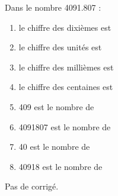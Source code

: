 \begin{exercice*}
    Dans le nombre \num{4 091.807} :
       \begin{enumerate}
          \item le chiffre des dixièmes est \dotfill\smallskip
          \item le chiffre des unités est \dotfill\smallskip
          \item le chiffre des millièmes est \dotfill\smallskip
          \item le chiffre des centaines est \dotfill\smallskip
          \item \num{409} est le nombre de \dotfill\smallskip
          \item \num{4 091 807} est le nombre de \dotfill\smallskip
          \item \num{40} est le nombre de \dotfill\smallskip
          \item \num{40 918} est le nombre de \dotfill
       \end{enumerate}
\end{exercice*}
\begin{corrige}
  Pas de corrigé.
\end{corrige}